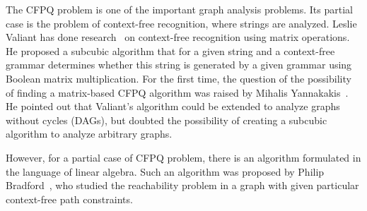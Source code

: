The CFPQ problem is one of the important graph analysis problems. Its partial case is the problem of context-free recognition, where strings are analyzed. Leslie Valiant has done research~\cite{valiant1975general} on context-free recognition using matrix operations. He proposed a subcubic algorithm that for a given string and a context-free grammar determines whether this string is generated by a given grammar using Boolean matrix multiplication. For the first time, the question of the possibility of finding a matrix-based CFPQ algorithm was raised by Mihalis Yannakakis~\cite{yannakakis1990graph}. He pointed out that Valiant's algorithm could be extended to analyze graphs without cycles (DAGs), but doubted the possibility of creating a subcubic algorithm to analyze arbitrary graphs.

However, for a partial case of CFPQ problem, there is an algorithm formulated in the language of linear algebra. Such an algorithm was proposed by Philip Bradford~\cite{bradford2017efficient}, who studied the reachability problem in a graph with given particular context-free path constraints.

